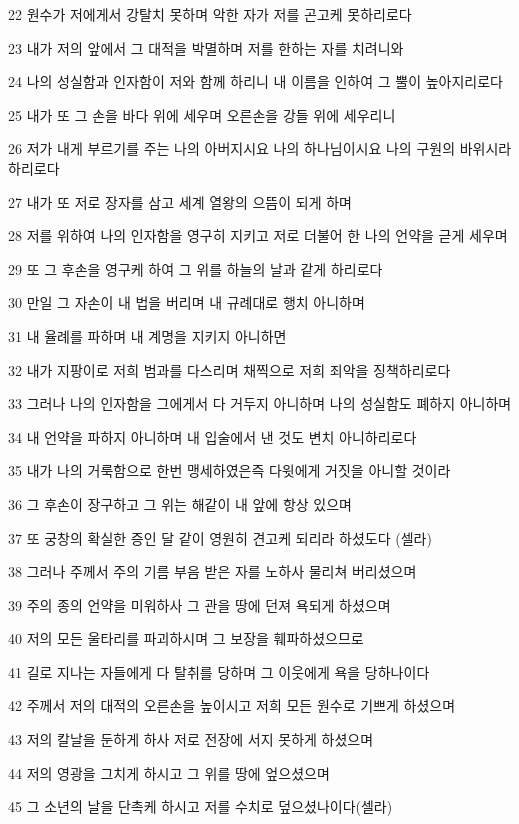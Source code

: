 \par 22 원수가 저에게서 강탈치 못하며 악한 자가 저를 곤고케 못하리로다
\par 23 내가 저의 앞에서 그 대적을 박멸하며 저를 한하는 자를 치려니와
\par 24 나의 성실함과 인자함이 저와 함께 하리니 내 이름을 인하여 그 뿔이 높아지리로다
\par 25 내가 또 그 손을 바다 위에 세우며 오른손을 강들 위에 세우리니
\par 26 저가 내게 부르기를 주는 나의 아버지시요 나의 하나님이시요 나의 구원의 바위시라 하리로다
\par 27 내가 또 저로 장자를 삼고 세계 열왕의 으뜸이 되게 하며
\par 28 저를 위하여 나의 인자함을 영구히 지키고 저로 더불어 한 나의 언약을 귿게 세우며
\par 29 또 그 후손을 영구케 하여 그 위를 하늘의 날과 같게 하리로다
\par 30 만일 그 자손이 내 법을 버리며 내 규례대로 행치 아니하며
\par 31 내 율례를 파하며 내 계명을 지키지 아니하면
\par 32 내가 지팡이로 저희 범과를 다스리며 채찍으로 저희 죄악을 징책하리로다
\par 33 그러나 나의 인자함을 그에게서 다 거두지 아니하며 나의 성실함도 폐하지 아니하며
\par 34 내 언약을 파하지 아니하며 내 입술에서 낸 것도 변치 아니하리로다
\par 35 내가 나의 거룩함으로 한번 맹세하였은즉 다윗에게 거짓을 아니할 것이라
\par 36 그 후손이 장구하고 그 위는 해같이 내 앞에 항상 있으며
\par 37 또 궁창의 확실한 증인 달 같이 영원히 견고케 되리라 하셨도다 (셀라)
\par 38 그러나 주께서 주의 기름 부음 받은 자를 노하사 물리쳐 버리셨으며
\par 39 주의 종의 언약을 미워하사 그 관을 땅에 던져 욕되게 하셨으며
\par 40 저의 모든 울타리를 파괴하시며 그 보장을 훼파하셨으므로
\par 41 길로 지나는 자들에게 다 탈취를 당하며 그 이웃에게 욕을 당하나이다
\par 42 주께서 저의 대적의 오른손을 높이시고 저희 모든 원수로 기쁘게 하셨으며
\par 43 저의 칼날을 둔하게 하사 저로 전장에 서지 못하게 하셨으며
\par 44 저의 영광을 그치게 하시고 그 위를 땅에 엎으셨으며
\par 45 그 소년의 날을 단촉케 하시고 저를 수치로 덮으셨나이다(셀라)
